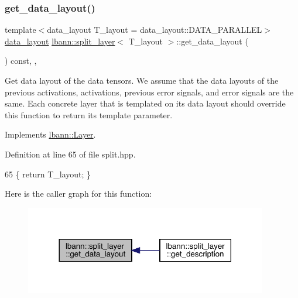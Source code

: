 \subsubsection{\texorpdfstring{get\+\_\+data\+\_\+layout()}{get\_data\_layout()}}
{\footnotesize\ttfamily template$<$data\+\_\+layout T\+\_\+layout = data\+\_\+layout\+::\+D\+A\+T\+A\+\_\+\+P\+A\+R\+A\+L\+L\+EL$>$ \\
\hyperlink{base_8hpp_a786677cbfb3f5677b4d84f3056eb08db}{data\+\_\+layout} \hyperlink{classlbann_1_1split__layer}{lbann\+::split\+\_\+layer}$<$ T\+\_\+layout $>$\+::get\+\_\+data\+\_\+layout (\begin{DoxyParamCaption}{ }\end{DoxyParamCaption}) const\hspace{0.3cm}{\ttfamily [inline]}, {\ttfamily [override]}, {\ttfamily [virtual]}}

Get data layout of the data tensors. We assume that the data layouts of the previous activations, activations, previous error signals, and error signals are the same. Each concrete layer that is templated on its data layout should override this function to return its template parameter. 

Implements \hyperlink{classlbann_1_1Layer_a5dfb66e81fc085997402a5e2241316bd}{lbann\+::\+Layer}.



Definition at line 65 of file split.\+hpp.


\begin{DoxyCode}
65 \{ \textcolor{keywordflow}{return} T\_layout; \}
\end{DoxyCode}
Here is the caller graph for this function\+:\nopagebreak
\begin{figure}[H]
\begin{center}
\leavevmode
\includegraphics[width=300pt]{classlbann_1_1split__layer_ad206038eac236a971664ccacec8faa82_icgraph}
\end{center}
\end{figure}
\mbox{\label{classlbann_1_1split__layer_a3e599c39385b1d707ad9f28454f52cf5}} 
